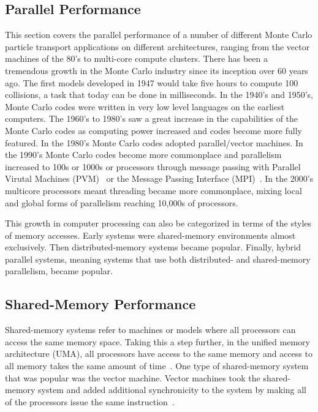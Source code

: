 \subsection{ \textbf{ Parallel Performance }}

This section covers the parallel performance of a number of different Monte Carlo particle transport applications on different architectures, ranging from the vector machines of the 80's to multi-core compute clusters.
%
There has been a tremendous growth in the Monte Carlo industry since its inception over 60 years ago.
%
The first models developed in 1947 would take five hours to compute 100 collisions, a task that today can be done in milliseconds.
%
In the 1940's and 1950's, Monte Carlo codes were written in very low level languages on the earliest computers.
%
The 1960's to 1980's saw a great increase in the capabilities of the Monte Carlo codes as computing power increased and codes become more fully featured.
%
In the 1980's Monte Carlo codes adopted parallel/vector machines.
%
In the 1990's Monte Carlo codes become more commonplace and parallelism increased to 100s or 1000s or processors through message passing with Parallel Virutal Machines (PVM)~\cite{pvm2011} or the Message Passing Interface (MPI)~\cite{blaiseMPI}.
%
In the 2000's multicore processors meant threading became more commonplace, mixing local and global forms of parallelism reaching 10,000s of processors.~\cite{brown2011recent}
%

This growth in computer processing can also be categorized in terms of the styles of memory accesses.
%
Early systems were shared-memory environments almost exclusively.
%
Then distributed-memory systems became popular.
%
Finally, hybrid parallel systems, meaning systems that use both distributed- and shared-memory parallelism, became popular.
%

\subsection*{ \textbf{Shared-Memory Performance}} 

Shared-memory systems refer to machines or models where all processors can access the same memory space.
%
Taking this a step further, in the unified memory architecture (UMA), all processors have access to the same memory and access to all memory takes the same amount of time~\cite{el2005advanced}.
%
One type of shared-memory system that was popular was the vector machine.
%
Vector machines took the shared-memory system and added additional synchronicity to the system by making all of the processors issue the same instruction~\cite{russell1978cray}.
%

